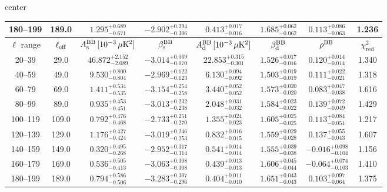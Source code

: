 \begin{table}[h]
\begin{adjustbox}{center}
\begin{tabular}{cccccccc}
180--199 & 189.0 & $1.295^{+0.689}_{-0.671}$ & $-2.902^{+0.294}_{-0.306}$ & $0.413^{+0.017}_{-0.016}$ & $1.685^{+0.062}_{-0.062}$ & $0.113^{+0.086}_{-0.063}$ & 1.236 \\
\midrule
$\ell$ range & $\ell_{\rm eff}$ & $A^{\rm BB}_{\rm s}\,[10^{-3}\,\mu\mathrm{K}^2]$ & $\beta^{\rm BB}_{\rm s}$ & $A^{\rm BB}_{\rm d}\,[10^{-3}\,\mu\mathrm{K}^2]$ & $\beta^{\rm BB}_{\rm d}$ & $\rho^{\rm BB}$ & $\chi^2_\mathrm{red}$ \\
\midrule
20--39 & 29.0 & $46.872^{+2.152}_{-2.089}$ & $-3.014^{+0.069}_{-0.070}$ & $22.853^{+0.315}_{-0.301}$ & $1.526^{+0.017}_{-0.016}$ & $0.120^{+0.014}_{-0.014}$ & 1.340 \\
40--59 & 49.0 & $9.530^{+0.800}_{-0.804}$ & $-2.969^{+0.122}_{-0.123}$ & $6.130^{+0.094}_{-0.092}$ & $1.503^{+0.019}_{-0.019}$ & $0.111^{+0.022}_{-0.021}$ & 1.318 \\
60--79 & 69.0 & $1.411^{+0.534}_{-0.535}$ & $-3.154^{+0.254}_{-0.258}$ & $3.440^{+0.052}_{-0.052}$ & $1.573^{+0.020}_{-0.020}$ & $0.083^{+0.047}_{-0.038}$ & 1.616 \\
80--99 & 89.0 & $0.935^{+0.453}_{-0.451}$ & $-3.013^{+0.232}_{-0.238}$ & $2.048^{+0.031}_{-0.032}$ & $1.584^{+0.023}_{-0.022}$ & $0.139^{+0.072}_{-0.049}$ & 1.429 \\
100--119 & 109.0 & $0.792^{+0.476}_{-0.468}$ & $-2.733^{+0.251}_{-0.270}$ & $1.355^{+0.024}_{-0.023}$ & $1.605^{+0.025}_{-0.025}$ & $0.113^{+0.084}_{-0.051}$ & 1.217 \\
120--139 & 129.0 & $1.176^{+0.427}_{-0.424}$ & $-3.019^{+0.246}_{-0.253}$ & $0.832^{+0.016}_{-0.015}$ & $1.559^{+0.029}_{-0.028}$ & $0.137^{+0.055}_{-0.043}$ & 1.607 \\
140--159 & 149.0 & $0.320^{+0.495}_{-0.268}$ & $-2.952^{+0.317}_{-0.314}$ & $0.541^{+0.014}_{-0.014}$ & $1.555^{+0.039}_{-0.038}$ & $-0.016^{+0.098}_{-0.104}$ & 1.156 \\
160--179 & 169.0 & $0.536^{+0.505}_{-0.413}$ & $-3.063^{+0.308}_{-0.308}$ & $0.439^{+0.013}_{-0.013}$ & $1.606^{+0.045}_{-0.044}$ & $-0.064^{+0.074}_{-0.103}$ & 1.410 \\
180--199 & 189.0 & $0.794^{+0.586}_{-0.506}$ & $-3.283^{+0.307}_{-0.296}$ & $0.404^{+0.011}_{-0.010}$ & $1.651^{+0.043}_{-0.043}$ & $0.103^{+0.097}_{-0.064}$ & 1.375 \\
\bottomrule
\end{tabular}
\end{adjustbox}
\end{table}
